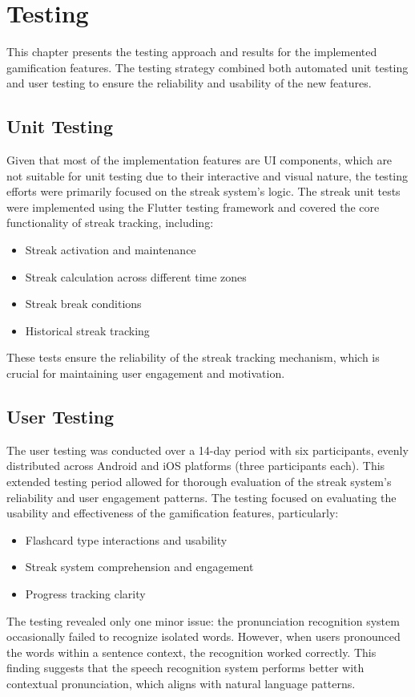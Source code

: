 \chapter{Testing}
\label{chap:testing}

This chapter presents the testing approach and results for the implemented gamification features. The testing strategy combined both automated unit testing and user testing to ensure the reliability and usability of the new features.

\section{Unit Testing}

Given that most of the implementation features are UI components, which are not suitable for unit testing due to their interactive and visual nature, the testing efforts were primarily focused on the streak system's logic. The streak unit tests were implemented using the Flutter testing framework and covered the core functionality of streak tracking, including:

\begin{itemize}
    \item Streak activation and maintenance
    \item Streak calculation across different time zones
    \item Streak break conditions
    \item Historical streak tracking
\end{itemize}

These tests ensure the reliability of the streak tracking mechanism, which is crucial for maintaining user engagement and motivation.

\newpage
\section{User Testing}
The user testing was conducted over a 14-day period with six participants, evenly distributed across Android and iOS platforms (three participants each). This extended testing period allowed for thorough evaluation of the streak system's reliability and user engagement patterns. The testing focused on evaluating the usability and effectiveness of the gamification features, particularly:
\begin{itemize}
    \item Flashcard type interactions and usability
    \item Streak system comprehension and engagement
    \item Progress tracking clarity
\end{itemize}
The testing revealed only one minor issue: the pronunciation recognition system occasionally failed to recognize isolated words. However, when users pronounced the words within a sentence context, the recognition worked correctly. This finding suggests that the speech recognition system performs better with contextual pronunciation, which aligns with natural language patterns.

